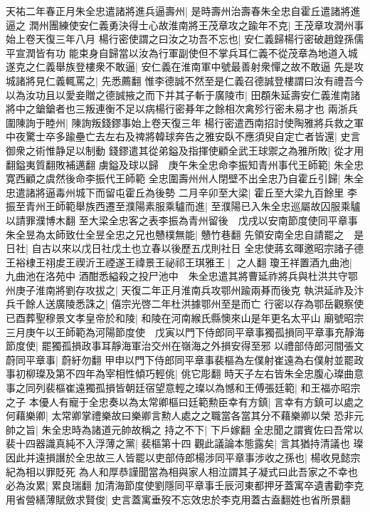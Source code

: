 天祐二年春正月朱全忠遣諸將進兵逼壽州|{
	是時壽州治壽春朱全忠自霍丘遣諸將進逼之}
潤州團練使安仁義勇決得士心故淮南將王茂章攻之踰年不克|{
	王茂章攻潤州事始上卷天復三年八月}
楊行密使謂之曰汝之功吾不忘也|{
	安仁義歸楊行密破趙鍠孫儒平宣潤皆有功}
能束身自歸當以汝為行軍副使但不掌兵耳仁義不從茂章為地道入城遂克之仁義舉族登樓衆不敢逼|{
	安仁義在淮南軍中號最善射衆憚之故不敢逼}
先是攻城諸將見仁義輒罵之|{
	先悉薦翻}
惟李德誠不然至是仁義召德誠登樓謂曰汝有禮吾今以為汝功且以愛妾贈之德誠掖之而下并其子斬于廣陵市|{
	田頵朱延壽安仁義淮南諸將中之鎗鎗者也三叛連衡不足以病楊行密朞年之餘相次禽殄行密未易才也}
兩浙兵圍陳詢于睦州|{
	陳詢叛錢鏐事始上卷天復三年}
楊行密遣西南招討使陶雅將兵救之軍中夜驚士卒多踰壘亡去左右及禆將韓球奔告之雅安臥不應須臾自定亡者皆還|{
	史言御衆之術惟静足以制動}
錢鏐遣其從弟鎰及指揮使顧全武王球禦之為雅所敗|{
	從才用翻鎰夷質翻敗補邁翻}
虜鎰及球以歸　庚午朱全忠命李振知青州事代王師範|{
	朱全忠寛西顧之虞然後命李振代王師範}
全忠圍壽州州人閉壁不出全忠乃自霍丘引歸|{
	朱全忠遣諸將逼毒州城下而留屯霍丘為後勢}
二月辛卯至大梁|{
	霍丘至大梁九百餘里}
李振至青州王師範舉族西遷至濮陽素服乘驢而進|{
	至濮陽已入朱全忠巡屬故囚服乘驢以請罪濮博木翻}
至大梁全忠客之表李振為青州留後　戊戌以安南節度使同平章事朱全昱為太師致仕全昱全忠之兄也戇樸無能|{
	戇竹巷翻}
先領安南全忠自請罷之　是日社|{
	自古以來以戊日社戊土也立春以後歷五戊則社日}
全忠使蔣玄暉邀昭宗諸子德王裕棣王祤䖍王禊沂王禋遂王禕景王祕祁王琪雅王|{
	之人翻}
瓊王祥置酒九曲池|{
	九曲池在洛苑中}
酒酣悉縊殺之投尸池中　朱全忠遣其將曹延祚將兵與杜洪共守鄂州庚子淮南將劉存攻拔之|{
	天復二年正月淮南兵攻鄂州踰兩朞而後克}
執洪延祚及汴兵千餘人送廣陵悉誅之|{
	僖宗光啓二年杜洪據鄂州至是而亡}
行密以存為鄂岳觀察使　已酉葬聖穆景文孝皇帝於和陵|{
	和陵在河南緱氏縣懊來山是年更名太平山}
廟號昭宗　三月庚午以王師範為河陽節度使　戊寅以門下侍郎同平章事獨孤損同平章事充靜海節度使|{
	罷獨孤損政事耳靜海軍治交州在嶺海之外損安得至邪}
以禮部侍郎河間張文蔚同平章事|{
	蔚紆勿翻}
甲申以門下侍郎同平章事裴樞為左僕射崔遠為右僕射並罷政事初柳璨及第不四年為宰相性傾巧輕佻|{
	佻它彫翻}
時天子左右皆朱全忠腹心璨曲意事之同列裴樞崔遠獨孤損皆朝廷宿望意輕之璨以為憾和王傅張廷範|{
	和王福亦昭宗之子}
本優人有寵于全忠奏以為太常卿樞曰廷範勲臣幸有方鎮|{
	言幸有方鎮可以處之}
何藉樂卿|{
	太常卿掌禮樂故曰樂卿言勲人處之之職當各當其分不藉樂卿以榮}
恐非元帥之旨|{
	朱全忠時為諸道元帥故稱之}
持之不下|{
	下戶嫁翻}
全忠聞之謂賓佐曰吾常以裴十四器識真純不入浮薄之黨|{
	裴樞第十四}
觀此議論本態露矣|{
	言其猶持清議也}
璨因此并遠損譖於全忠故三人皆罷以吏部侍郎楊涉同平章事涉收之孫也|{
	楊收見懿宗紀為相以罪貶死}
為人和厚恭謹聞當為相與家人相泣謂其子凝式曰此吾家之不幸也必為汝累|{
	累良瑞翻}
加清海節度使劉隱同平章事壬辰河東都押牙蓋寓卒遺書勸李克用省營繕薄賦斂求賢俊|{
	史言蓋寓垂歿不忘效忠於李克用蓋古盍翻姓也省所景翻}

